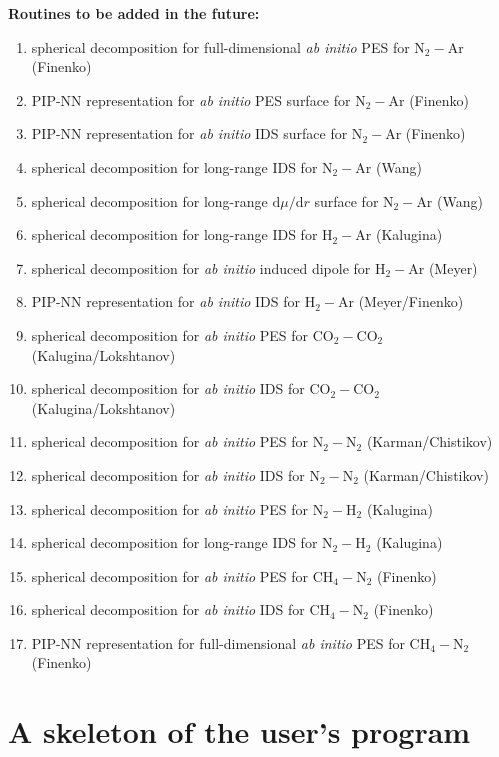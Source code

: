 \documentclass{article}
\begin{document}
\noindent
{\textbf{Routines to be added in the future:}}
\begin{enumerate}
\item spherical decomposition for full-dimensional \textit{ab initio} PES for N$_2-$Ar (Finenko)
\item PIP-NN representation for \textit{ab initio} PES surface for N$_2-$Ar (Finenko)
\item PIP-NN representation for \textit{ab initio} IDS surface for N$_2-$Ar (Finenko)
\item spherical decomposition for long-range IDS for N$_2-$Ar (Wang)
\item spherical decomposition for long-range $\textrm{d}\mu/\textrm{d}r$ surface for N$_2-$Ar (Wang)
\item spherical decomposition for long-range IDS for H$_2-$Ar (Kalugina)
\item spherical decomposition for \textit{ab initio} induced dipole for H$_2-$Ar (Meyer)
\item PIP-NN representation for \textit{ab initio} IDS for H$_2-$Ar (Meyer/Finenko)
\item spherical decomposition for \textit{ab initio} PES for CO$_2-$CO$_2$ (Kalugina/Lokshtanov)
\item spherical decomposition for \textit{ab initio} IDS for CO$_2-$CO$_2$ (Kalugina/Lokshtanov)
\item spherical decomposition for \textit{ab initio} PES for N$_2-$N$_2$ (Karman/Chistikov)
\item spherical decomposition for \textit{ab initio} IDS for N$_2-$N$_2$ (Karman/Chistikov)
\item spherical decomposition for \textit{ab initio} PES for N$_2-$H$_2$ (Kalugina)
\item spherical decomposition for long-range IDS for N$_2-$H$_2$ (Kalugina)
\item spherical decomposition for \textit{ab initio} PES for CH$_4-$N$_2$ (Finenko)
\item spherical decomposition for \textit{ab initio} IDS for CH$_4-$N$_2$ (Finenko)
\item PIP-NN representation for full-dimensional \textit{ab initio} PES for CH$_4-$N$_2$ (Finenko)
\end{enumerate}



\section{A skeleton of the user's program}
\label{sec:user-program}
\end{document}
